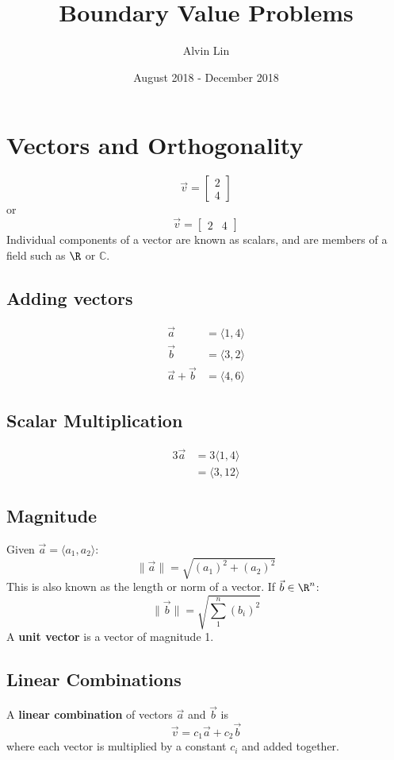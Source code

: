 \documentclass{math}
\title{Boundary Value Problems}
\author{Alvin Lin}
\date{August 2018 - December 2018}
\begin{document}
\maketitle

\section*{Vectors and Orthogonality}
\[ \vec{v} = \begin{bmatrix}2 \\ 4\end{bmatrix} \]
or
\[ \vec{v} = \begin{bmatrix}2 & 4\end{bmatrix} \]
Individual components of a vector are known as scalars, and are members of a
field such as \( \R \) or \( \mathbb{C} \).

\subsection*{Adding vectors}
\begin{align*}
  \vec{a} &= \langle1,4\rangle \\
  \vec{b} &= \langle3,2\rangle \\
  \vec{a}+\vec{b} &= \langle4,6\rangle
\end{align*}

\subsection*{Scalar Multiplication}
\begin{align*}
  3\vec{a} &= 3\langle1,4\rangle \\
  &= \langle3,12\rangle
\end{align*}

\subsection*{Magnitude}
Given \( \vec{a} = \langle a_1,a_2\rangle \):
\[ \|\vec{a}\| = \sqrt{(a_1)^2+(a_2)^2} \]
This is also known as the length or norm of a vector. If \( \vec{b}\in\R^n \):
\[ \|\vec{b}\| = \sqrt{\sum_1^n{(b_i)^2}} \]
A \textbf{unit vector} is a vector of magnitude 1.

\subsection*{Linear Combinations}
A \textbf{linear combination} of vectors \( \vec{a} \) and \( \vec{b} \) is
\[ \vec{v} = c_1\vec{a}+c_2\vec{b} \]
where each vector is multiplied by a constant \( c_i \) and added together.
\end{document}
